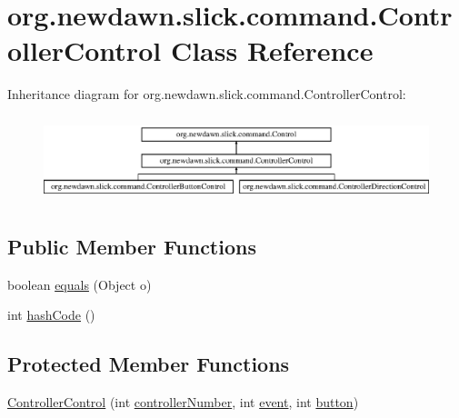 \hypertarget{classorg_1_1newdawn_1_1slick_1_1command_1_1_controller_control}{}\section{org.\+newdawn.\+slick.\+command.\+Controller\+Control Class Reference}
\label{classorg_1_1newdawn_1_1slick_1_1command_1_1_controller_control}
Inheritance diagram for org.\+newdawn.\+slick.\+command.\+Controller\+Control\+:\begin{figure}[H]
\begin{center}
\leavevmode
\includegraphics[height=2.514970cm]{classorg_1_1newdawn_1_1slick_1_1command_1_1_controller_control}
\end{center}
\end{figure}
\subsection*{Public Member Functions}
\begin{DoxyCompactItemize}
\item 
boolean \mbox{\hyperlink{classorg_1_1newdawn_1_1slick_1_1command_1_1_controller_control_acfe105999ec655c1e74ae103d439c9fd}{equals}} (Object o)
\item 
int \mbox{\hyperlink{classorg_1_1newdawn_1_1slick_1_1command_1_1_controller_control_a39f49615766d263e781442f9b553694a}{hash\+Code}} ()
\end{DoxyCompactItemize}
\subsection*{Protected Member Functions}
\begin{DoxyCompactItemize}
\item 
\mbox{\hyperlink{classorg_1_1newdawn_1_1slick_1_1command_1_1_controller_control_adf8bbe383d714ea06a61632b6b7e250c}{Controller\+Control}} (int \mbox{\hyperlink{classorg_1_1newdawn_1_1slick_1_1command_1_1_controller_control_a4372c7c9a9aa160ea43f48dc27b1ad40}{controller\+Number}}, int \mbox{\hyperlink{classorg_1_1newdawn_1_1slick_1_1command_1_1_controller_control_abd69f401973385e8f882097235fcda38}{event}}, int \mbox{\hyperlink{classorg_1_1newdawn_1_1slick_1_1command_1_1_controller_control_ad8d48f8cc2889d5360de6dc2202203f4}{button}})
\end{DoxyCompactItemize}
